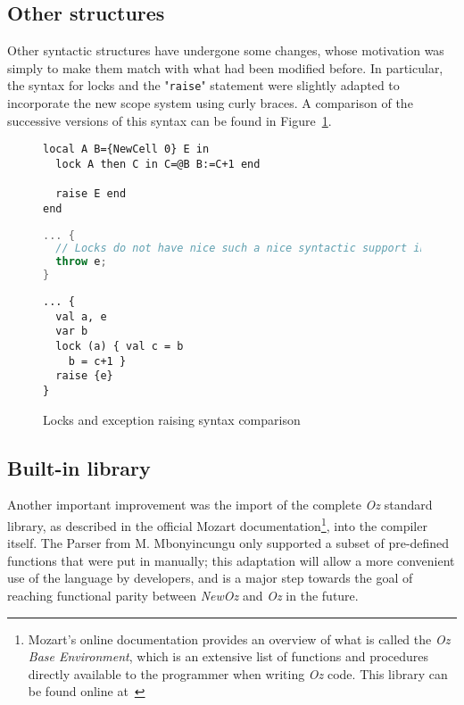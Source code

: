 \subsection{Other structures}
Other syntactic structures have undergone some changes, whose motivation was simply to make them match with what had been modified before.
In particular, the syntax for locks and the "\texttt{raise}" statement were slightly adapted to incorporate the new scope system using curly braces.
A comparison of the successive versions of this syntax can be found in Figure~\ref{fig:code-comp-other}.
\begin{figure}
    \noindent\begin{minipage}{.49\textwidth}
\begin{lstlisting}[title={Oz},language=oz]
local A B={NewCell 0} E in
  lock A then C in C=@B B:=C+1 end

  raise E end
end
\end{lstlisting}
    \end{minipage}
    \hfill
    \noindent\begin{minipage}{.49\textwidth}
\begin{lstlisting}[title={Ozma},language=scala]
... {
  // Locks do not have nice such a nice syntactic support in Scala
  throw e;
}
\end{lstlisting}
    \end{minipage}
    \begin{center}
    \noindent\begin{minipage}{.89\textwidth}
\begin{lstlisting}[title={NewOz 2020/2021},language=newoz]
... {
  val a, e
  var b
  lock (a) { val c = b
    b = c+1 }
  raise {e}
}
\end{lstlisting}
    \end{minipage}
    \end{center}
\caption{Locks and exception raising syntax comparison}
\label{fig:code-comp-other}
\end{figure}

\subsection{Built-in library}
Another important improvement was the import of the complete \textit{Oz} standard library, as described in the official Mozart documentation\footnote{Mozart's online documentation provides an overview of what is called the \textit{Oz Base Environment}, which is an extensive list of functions and procedures directly available to the programmer when writing \textit{Oz} code. This library can be found online at~\cite{mozart2doc}}, into the compiler itself.
The Parser from M. Mbonyincungu only supported a subset of pre-defined functions that were put in manually;
this adaptation will allow a more convenient use of the language by developers, and is a major step towards the goal of reaching functional parity between \textit{NewOz} and \textit{Oz} in the future.


